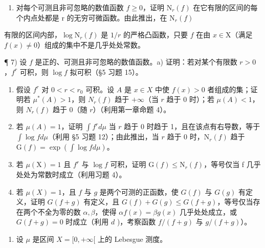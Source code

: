 \begin{enumerate}
\def\labelenumi{\arabic{enumi})}
\setcounter{enumi}{5}
\tightlist
\item
  对每个可测且非可忽略的数值函数 \(f \geqslant 0\)，证明 \(\mathrm{N}_{r}(f)\) 在它有限的区间的每个内点处都是 r 的无穷可微函数。由此推出，在 \(\mathrm{N}_{r}(f)\)
\end{enumerate}

有限的区间内部，\(\log \mathrm{N}_r(f)\) 是 \(1 / r\) 的严格凸函数，只要 \(f\) 在由 \(x\in \mathrm{X}\)（满足 \(f(x)\neq 0\)）组成的集中不是几乎处处常数。

¶ 7) 设 \(f\) 是正的、可测且非可忽略的数值函数。a) 证明：若对某个有限数 \(r > 0\)，\(f^r\) 可积，则 \(\log f\) 拟可积（§5 习题 15）。

\begin{enumerate}
\def\labelenumi{\alph{enumi})}
\setcounter{enumi}{1}
\item
  假设 \(f^r\) 对 \(0 < r < r_0\) 可积。设 \(A\) 是 \(x \in X\) 中使 \(f(x) > 0\) 者组成的集；证明若 \(\mu^*(A) > 1\)，则 \(N_r(f)\) 趋于 \(+\infty\)（当 \(r\) 趋于 \(0\) 时）；若 \(\mu(A) < 1\)，则 \(N_r(f)\) 趋于 \(0\)（随 \(r\)）（利用第一章命题 4）。
\item
  若 \(\mu(A) = 1\)，证明 \(\int f^r d\mu\) 当 \(r\) 趋于 0 时趋于 1，且在该点有右导数，等于 \(\int \log f d\mu\)（利用 §5 习题 12）；由此推出，当 \(r\) 趋于 0 时，\(\mathrm{N}_r(f)\) 趋于 \(\mathrm{G}(f) = \exp(\int \log f d\mu)\)。
\item
  若 \(\mu(\mathrm{X})=1\) 且 \(f^{r}\) 与 \(\log f\) 可积，证明 \(\mathrm{G}(f)\leqslant\mathrm{N}_{r}(f)\)，等号仅当 f 几乎处处为常数时成立（利用习题 4）。
\item
  若 \(\mu(X) = 1\)，且 \(f\) 与 \(g\) 是两个可测的正函数，使 \(G(f)\) 与 \(G(g)\) 有定义，证明 \(G(f + g)\) 有定义，且 \(G(f) + G(g) \leqslant G(f + g)\)，等号仅当存在两个不全为零的数 \(\alpha, \beta\)，使得 \(\alpha f(x) = \beta g(x)\) 几乎处处成立，或 \(G(f + g) = 0\) 时成立（利用 \(d\) )，考察函数 \(f/(f + g)\) 与 \(g/(f + g)\)）。
\end{enumerate}

\begin{enumerate}
\def\labelenumi{\arabic{enumi})}
\setcounter{enumi}{7}
\tightlist
\item
  设 \(\mu\) 是区间 \(X = [0, +\infty[\) 上的 Lebesgue 测度。
\end{enumerate}

